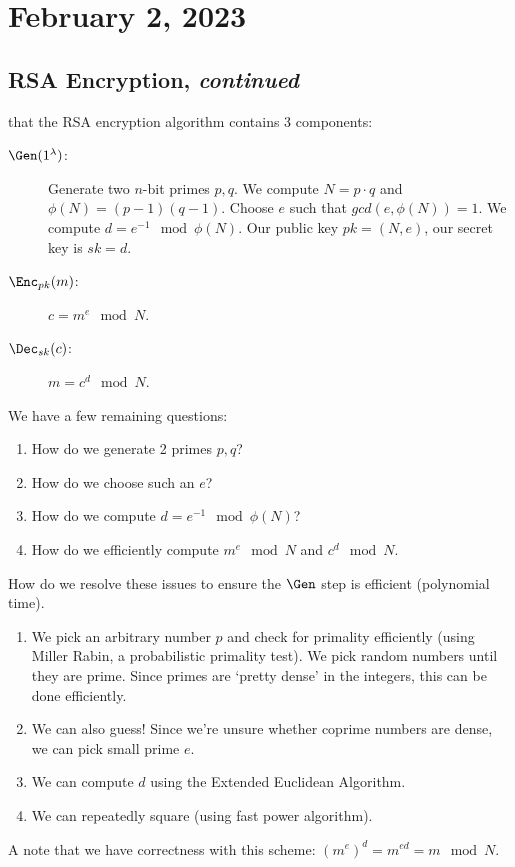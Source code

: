 \section{February 2, 2023}
\label{20230202}
\subsection{RSA Encryption, \emph{continued}}
\recall that the RSA encryption algorithm contains 3 components:
\begin{description}
    \item[$\Gen(1^\lambda)$:] Generate two $n$-bit primes $p, q$. We compute $N = p\cdot q$ and $\phi(N) = (p-1)(q-1)$. Choose $e$ such that $gcd(e, \phi(N)) = 1$. We compute $d = e^{-1}\mod{\phi(N)}$. Our public key $pk = (N, e)$, our secret key is $sk = d$.
    \item[$\Enc_{pk}(m)$:] $c = m^e\mod{N}$.
    \item[$\Dec_{sk}(c)$:] $m = c^d\mod{N}$.
\end{description}
We have a few remaining questions:
\begin{enumerate}
    \item How do we generate 2 primes $p, q$?
    \item How do we choose such an $e$?
    \item How do we compute $d = e^{-1}\mod{\phi(N)}$?
    \item How do we efficiently compute $m^e\mod{N}$ and $c^d\mod N$.
\end{enumerate}
How do we resolve these issues to ensure the $\Gen$ step is efficient (polynomial time).
\begin{enumerate}
    \item We pick an arbitrary number $p$ and check for primality efficiently (using Miller Rabin, a probabilistic primality test). We pick random numbers until they are prime. Since primes are `pretty dense' in the integers, this can be done efficiently.
    \item We can also guess! Since we're unsure whether coprime numbers are dense, we can pick small prime $e$.
    \item We can compute $d$ using the Extended Euclidean Algorithm.
    \item We can repeatedly square (using fast power algorithm).
\end{enumerate}

A note that we have correctness with this scheme: $(m^e)^d= m^{ed} = m\mod N$.

